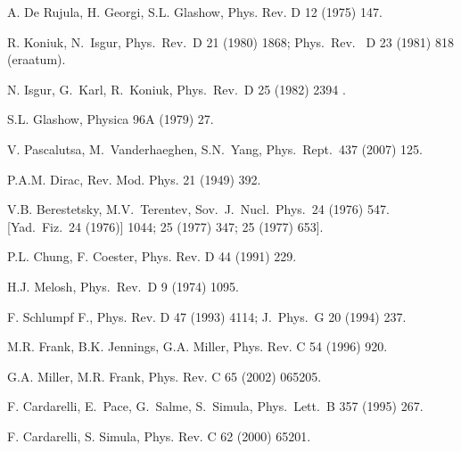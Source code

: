 \begin{thebibliography}{PPV06}
A. De Rujula, H. Georgi, S.L. Glashow, Phys. Rev. D 12 (1975) 147. 

R. Koniuk, N.~Isgur,
  Phys.\ Rev.\ D 21 (1980) 1868;
  Phys.\ Rev. \ D 23 (1981) 818 (eraatum).

N. Isgur, G.~Karl, R.~Koniuk,
  Phys.\ Rev.\ D 25 (1982) 2394 .

S.L. Glashow, Physica  96A (1979) 27.

V. Pascalutsa, M.~Vanderhaeghen, S.N.~Yang,
  Phys.\ Rept.\  437 (2007) 125. 

P.A.M. Dirac, Rev. Mod. Phys. 21 (1949) 392.

  V.B. Berestetsky, M.V.~Terentev,
  Sov.\ J.\ Nucl.\ Phys.\  24 (1976) 547.
  [Yad.\ Fiz.\  24 (1976)] 1044;
  25 (1977) 347;
  25 (1977) 653].

P.L. Chung, F. Coester, Phys. Rev. D 44 (1991) 229.

  H.J. Melosh,
  Phys.\ Rev.\ D  9 (1974) 1095.

F. Schlumpf F., Phys. Rev. D  47 (1993) 4114;
  J.\ Phys.\ G  20 (1994) 237.

M.R. Frank, B.K. Jennings, G.A. Miller, 
Phys. Rev. C  54 (1996) 920. 

G.A. Miller, M.R. Frank, Phys. Rev. C  65 (2002) 065205.

F. Cardarelli, E.~Pace, G.~Salme, S.~Simula,
  Phys.\ Lett.\ B 357 (1995) 267.

F. Cardarelli, S. Simula, Phys. Rev. C  62 (2000) 65201.


\end{thebibliography}
